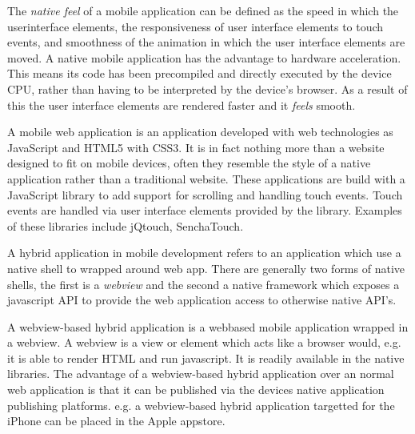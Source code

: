 
The \emph{native feel} of a mobile application can be defined as the speed in which the userinterface elements, the responsiveness of user interface elements to touch events, and smoothness of the animation in which the user interface elements are moved. A native mobile application has the advantage to hardware acceleration. This means its code has been precompiled and directly executed by the device CPU, rather than having to be interpreted by the device's browser. As a result of this the user interface elements are rendered faster and it \emph{feels} smooth.
 	

A mobile web application is an application developed with web technologies as JavaScript and HTML5 with CSS3. It is in fact nothing more than a website designed to fit on mobile devices, often they resemble the style of a native application rather than a traditional website. These applications are build with a JavaScript library to add support for scrolling and handling touch events. Touch events are handled via user interface elements provided by the library. Examples of these libraries include jQtouch, SenchaTouch.


A hybrid application in mobile development refers to an application which use a native shell to wrapped around web app. There are generally two forms of native shells, the first is a \emph{webview} and the second a native framework which exposes a javascript API to provide the web application access to otherwise native API's.

A webview-based hybrid application is a webbased mobile application wrapped in a webview. A webview is a view or element which acts like a browser would, e.g. it is able to render HTML and run javascript.  It is readily available in the native libraries. The advantage of a webview-based hybrid application over an normal web application is that it can be published via the devices native application publishing platforms. e.g. a webview-based hybrid application targetted for the iPhone can be placed in the Apple appstore. 

